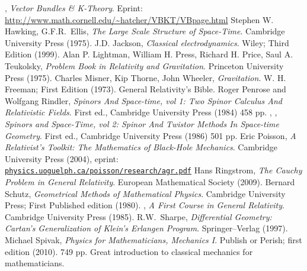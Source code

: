 \begin{thebibliography}{99}
  \bysame,\newblock
  \emph{Vector Bundles \& K-Theory}.\newblock
  Eprint: \url{http://www.math.cornell.edu/~hatcher/VBKT/VBpage.html}
  Stephen W. Hawking, G.F.R.\ Ellis,\newblock
  \emph{The Large Scale Structure of Space-Time}.\newblock
  Cambridge University Press (1975).
  J.D. Jackson,\newblock
  \emph{Classical electrodynamics}.\newblock
  Wiley; Third Edition (1999).
  Alan P. Lightman, William H. Press, Richard H. Price, Saul A. Teukolsky,\newblock
  \emph{Problem Book in Relativity and Gravitation}.\newblock
  Princeton University Press (1975).
  Charles Misner, Kip Thorne, John Wheeler,\newblock
  \emph{Gravitation}.\newblock
  W. H. Freeman; First Edition (1973).\newblock
  General Relativity's Bible.
  Roger Penrose and Wolfgang Rindler,\newblock
  \emph{Spinors And Space-time, vol 1: Two Spinor Calculus And Relativistic Fields}.\newblock
  First ed., Cambridge University Press (1984) 458 pp.
  \bysame, \bysame,\newblock
  \emph{Spinors and Space-Time, vol 2: Spinor And Twistor Methods In Space-time Geometry}.\newblock
  First ed., Cambridge University Press (1986) 501 pp.
  Eric Poisson,\newblock
  \emph{A Relativist's Toolkit: The Mathematics of Black-Hole Mechanics}.\newblock
  Cambridge University Press (2004), eprint: \href{http://www.physics.uoguelph.ca/poisson/research/agr.pdf}{{\texttt{physics.uoguelph.ca/poisson/research/agr.pdf}}}
  Hans Ringstrom,\newblock
  \emph{The Cauchy Problem in General Relativity}.\newblock
  European Mathematical Society (2009).
  Bernard Schutz,\newblock
  \emph{Geometrical Methods of Mathematical Physics}.\newblock
  Cambridge University Press; First Published edition (1980).
  \bysame,\newblock
  \emph{A First Course in General Relativity}.\newblock
  Cambridge University Press (1985).
  R.W.~Sharpe,\newblock
  \emph{Differential Geometry: Cartan's Generalization of Klein's Erlangen Program}.\newblock
  Springer--Verlag (1997).
  Michael Spivak,\newblock
  \emph{Physics for Mathematicians, Mechanics I}.\newblock
  Publish or Perish; first edition (2010). 749 pp.\newblock
  Great introduction to classical mechanics for mathematicians.

\end{thebibliography}
